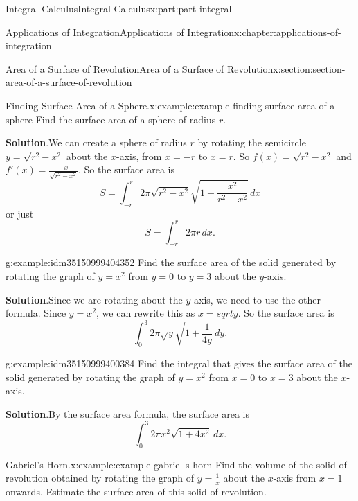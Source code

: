 \documentclass[twoside,10pt,]{book}
\newcommand{\blocktitlefont}{\relax}
\numberwithin{equation}{part}
\begin{document}
\begin{partptx}{Integral Calculus}{}{Integral Calculus}{}{}{x:part:part-integral}
\begin{chapterptx}{Applications of Integration}{}{Applications of Integration}{}{}{x:chapter:applications-of-integration}
\begin{sectionptx}{Area of a Surface of Revolution}{}{Area of a Surface of Revolution}{}{}{x:section:section-area-of-a-surface-of-revolution}
\begin{equation*}
\end{equation*}
%
\begin{example}{Finding Surface Area of a Sphere.}{x:example:example-finding-surface-area-of-a-sphere}%
Find the surface area of a sphere of radius \(r\).%
\par\smallskip%
\noindent\textbf{\blocktitlefont Solution}.\hypertarget{g:solution:idm35150999408192}{}\quad{}We can create a sphere of radius \(r\) by rotating the semicircle \(y=\sqrt{r^{2}-x^{2}}\) about the \(x\)-axis, from \(x=-r\) to \(x=r\). So \(f(x)=\sqrt{r^{2}-x^{2}}\) and \(f'(x)=\displaystyle\frac{-x}{\sqrt{r^{2}-x^{2}}}\). So the surface area is%
\begin{equation*}
S=\int_{-r}^{r}2\pi\sqrt{r^{2}-x^{2}}\sqrt{1+\frac{x^{2}}{r^{2}-x^{2}}}\,dx
\end{equation*}
or just%
\begin{equation*}
S=\int_{-r}^{r}2\pi r \, dx.
\end{equation*}
%
\end{example}
\begin{example}{}{g:example:idm35150999404352}%
Find the surface area of the solid generated by rotating the graph of \(y=x^{2}\) from \(y=0\) to \(y=3\) about the \(y\)-axis.%
\par\smallskip%
\noindent\textbf{\blocktitlefont Solution}.\hypertarget{g:solution:idm35150999402304}{}\quad{}Since we are rotating about the \(y\)-axis, we need to use the other formula. Since \(y=x^{2}\), we can rewrite this as \(x=sqrt{y}\). So the surface area is%
\begin{equation*}
\int_{0}^{3}2\pi\sqrt{y}\sqrt{1+\frac{1}{4y}}\,dy.
\end{equation*}
%
\end{example}
\begin{example}{}{g:example:idm35150999400384}%
Find the integral that gives the surface area of the solid generated by rotating the graph of \(y=x^{2}\) from \(x=0\) to \(x=3\) about the \(x\)-axis.%
\par\smallskip%
\noindent\textbf{\blocktitlefont Solution}.\hypertarget{g:solution:idm35150999398336}{}\quad{}By the surface area formula, the surface area is%
\begin{equation*}
\int_{0}^{3}2 \pi x^{2} \sqrt{1+4x^{2}}\,dx.
\end{equation*}
%
\end{example}
\begin{example}{Gabriel's Horn.}{x:example:example-gabriel-s-horn}%
Find the volume of the solid of revolution obtained by rotating the graph of \(y = \frac{1}{x}\) about the \(x\)-axis from \(x = 1\) onwards. Estimate the surface area of this solid of revolution.%

\end{example}
\end{sectionptx}
\end{chapterptx}
\end{partptx}
\end{document}
